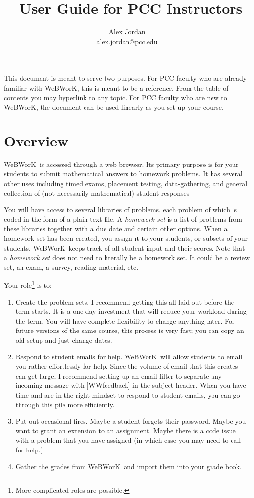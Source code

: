 \documentclass[12pt]{article}
\title{\WW\ User Guide for PCC Instructors}
\author{Alex Jordan\\\href{mailto:alex.jordan@pcc.edu}{alex.jordan@pcc.edu}}
\newcommand{\WW}{WeBWorK}
\begin{document}
\maketitle

This document is meant to serve two purposes. For PCC faculty who are already familiar with \WW, this is meant to be a reference. From the table of contents you may hyperlink to any topic. For PCC faculty who are new to \WW, the document can be used linearly as you set up your course. 

\footnotesize
\setcounter{tocdepth}{2}
\tableofcontents

\setlength{\parskip}{10pt}

\newpage
\normalsize

\section{Overview}

\WW\ is accessed through a web browser. Its primary purpose is for your students to submit mathematical answers to homework problems. It has several other uses including timed exams, placement testing, data-gathering, and general collection of (not necessarily mathematical) student responses.

You will have access to several libraries of problems, each problem of which is coded in the form of a plain text file.  A \emph{homework set} is a list of problems from these libraries together with a due date and certain other options. When a homework set has been created, you assign it to your students, or subsets of your students. \WW\ keeps track of all student input and their scores. Note that a \emph{homework set} does not need to literally be a homework set. It could be a review set, an exam, a survey, reading material, etc.

Your role\footnote{More complicated roles are possible.} is to:
\begin{enumerate}
\item Create the problem sets. I recommend getting this all laid out before the term starts. It is a one-day investment that will reduce your workload during the term. You will have complete flexibility to change anything later. For future versions of the same course, this process is very fast; you can copy an old setup and just change dates.
\item Respond to student emails for help.  \WW\ will allow students to email you rather effortlessly for help. Since the volume of email that this creates can get large, I recommend setting up an email filter to separate any incoming message with [WWfeedback] in the subject header. When you have time and are in the right mindset to respond to student emails, you can go through this pile more efficiently.
\item Put out occasional fires. Maybe a student forgets their password. Maybe you want to grant an extension to an assignment. Maybe there is a code issue with a problem that you have assigned (in which case you may need to call for help.)
\item Gather the grades from \WW\ and import them into your grade book.
\end{enumerate}
\end{document}
